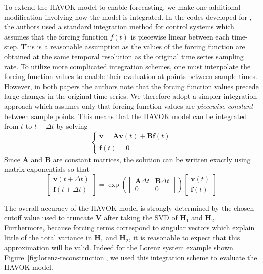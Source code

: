 To extend the HAVOK model to enable forecasting, we make one additional
modification involving how the model is integrated. In the codes developed for
\cite{brunton-havok-orig, havok-diffgeo}, the authors used a standard
integration method for control systems which assumes that the forcing
function $f(t)$ is piecewise linear between each time-step. This is a reasonable
assumption as the values of the forcing function are obtained at the same
temporal resolution as the original time series sampling rate. To utilize more
complicated integration schemes, one must interpolate the forcing function
values to enable their evaluation at points between sample times. However, in
both papers the authors note that the forcing function values precede large
changes in the original time series. We therefore adopt a simpler integration
approach which assumes only that forcing function values are
\textit{piecewise-constant} between sample points. This means that the HAVOK
model can be integrated from $t$ to $t+\Delta t$ by solving
\begin{equation}
  \begin{cases}
    \dot{\mathbf{v}} = \mathbf{A}\mathbf{v}(t) + \mathbf{B}\mathbf{f}(t) \\
    \dot{\mathbf{f}}(t) = 0
  \end{cases}
\end{equation}
Since $\mathbf{A}$ and $\mathbf{B}$ are constant matrices, the solution can be
written exactly using matrix exponentials so that
\begin{equation}\label{eq:havok-int}
  \begin{bmatrix} \mathbf{v}(t+\Delta t) \\ \mathbf{f}(t+\Delta t) \end{bmatrix} = \exp \left(  \begin{bmatrix}
    \mathbf{A}\Delta t & \mathbf{B} \Delta t \\
    0 & 0
  \end{bmatrix} \right) \begin{bmatrix} \mathbf{v}(t) \\ \mathbf{f}(t) \end{bmatrix}
\end{equation}

The overall accuracy of the HAVOK model is strongly determined by the chosen
cutoff value used to truncate $\mathbf{V}$ after taking the SVD of
$\mathbf{H}_1$ and $\mathbf{H}_2$. Furthermore, because forcing terms correspond
to singular vectors which explain little of the total variance in $\mathbf{H}_1$
and $\mathbf{H}_2$, it is reasonable to expect that this approximation will be
valid. Indeed for the Lorenz system example shown
Figure~\ref{fig:lorenz-reconstruction}, we used this integration scheme to
evaluate the HAVOK model.


